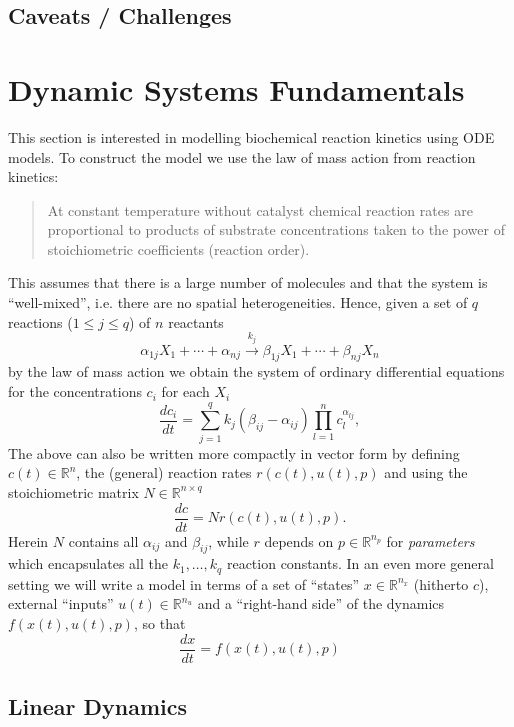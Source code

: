 \documentclass[a4paper]{article}
\theoremstyle{plain}
\theoremstyle{definition}
\theoremstyle{remark}
\begin{document}
\subsection{Caveats / Challenges}


\section{Dynamic Systems Fundamentals}

This section is interested in modelling biochemical reaction kinetics using
ODE models. To construct the model we use the law of mass action from reaction
kinetics:
\begin{quote}
  At constant temperature without catalyst chemical reaction rates are
  proportional to products of substrate concentrations taken to the power of
  stoichiometric coefficients (reaction order).
\end{quote}
This assumes that there is a large number of molecules and that the system is
``well-mixed'', i.e. there are no spatial heterogeneities. Hence, given a
set of $q$ reactions ($1 \leq j \leq q$) of $n$ reactants
\[
  \alpha_{1j} X_1 + \cdots + \alpha_{nj}
  \stackrel{k_j}{\longrightarrow}
  \beta_{1j} X_1 + \cdots + \beta_{nj} X_n
\]
by the law of mass action we obtain the system of ordinary differential
equations for the concentrations $c_i$ for each $X_i$
\[
  \frac{dc_i}{dt} = \sum_{j=1}^q k_j (\beta_{ij} - \alpha_{ij})
    \prod_{l=1}^n c_l^{\alpha_{lj}},
\]
The above can also be written more compactly in vector form by defining $c(t)
\in \mathbb{R}^{n}$, the (general) reaction rates $r(c(t), u(t), p)$ and using
the stoichiometric matrix $N \in \mathbb{R}^{n \times q}$
\[
  \frac{dc}{dt} = N r(c(t), u(t), p).
\]
Herein $N$ contains all $\alpha_{ij}$ and $\beta_{ij}$, while $r$ depends on
$p \in \mathbb{R}^{n_p}$ for \emph{parameters} which encapsulates all the
$k_1, \ldots, k_q$ reaction constants. In an even more general setting we will
write a model in terms of a set of ``states'' $x \in \mathbb{R}^{n_x}$
(hitherto $c$), external ``inputs'' $u(t) \in \mathbb{R}^{n_u}$ and a
``right-hand side'' of the dynamics $f(x(t), u(t), p)$, so that
\[
  \frac{dx}{dt} = f(x(t), u(t), p)
\]

\subsection{Linear Dynamics}
\end{document}
